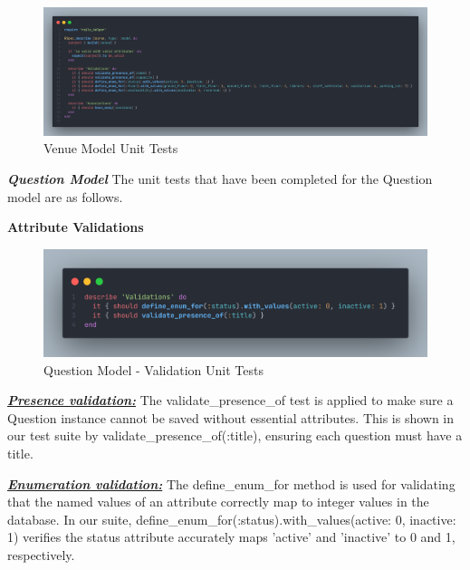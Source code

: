 \begin{justify}
    \begin{figure}[H]
        \centerline{\includegraphics[width=140mm,scale=1]{figures/implementation_and_testing/testing/AUT/venue/all.png}}
        \caption{Venue Model Unit Tests}
        \label{Venue Model Unit Tests}
    \end{figure}





\newendline \textbf{\textit{Question Model}}\newendline
The unit tests that have been completed for the Question model are as follows.

\vspace{0.25cm}
\newendline
\textbf{Attribute Validations}

    \begin{figure}[H]
        \centerline{\includegraphics[width=140mm,scale=1]{figures/implementation_and_testing/testing/AUT/question/validations.png}}
        \caption{Question Model - Validation Unit Tests}
        \label{Question Model - Validation Unit Tests}
    \end{figure}

\vspace{0.25cm}
\noindent\textbf{\textit{\underline{Presence validation:}}} The validate\_presence\_of test is applied to make sure a Question instance cannot be saved without essential attributes. This is shown in our test suite by validate\_presence\_of(:title), ensuring each question must have a title.

\vspace{0.25cm}
\noindent\textbf{\textit{\underline{Enumeration validation:}}} The define\_enum\_for method is used for validating that the named values of an attribute correctly map to integer values in the database. In our suite, define\_enum\_for(:status).with\_values(active: 0, inactive: 1) verifies the status attribute accurately maps 'active' and 'inactive' to 0 and 1, respectively.


\end{justify}
